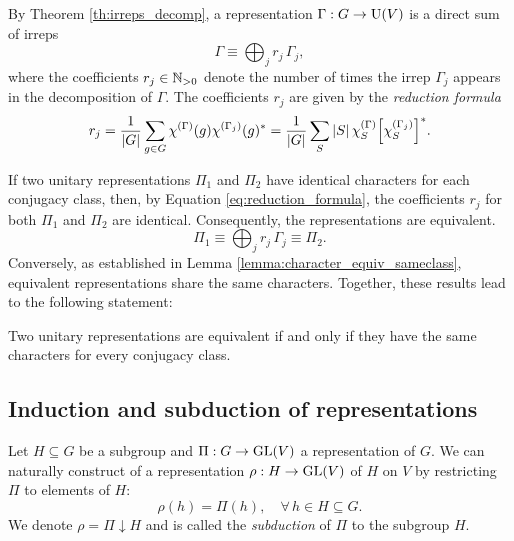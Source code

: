 \begin{theorem} \label{th:reduction_formula}
By Theorem \ref{th:irreps_decomp}, a representation $\Gamma: G \to {\text{U}}(V)$ is a direct sum of irreps
\begin{equation} \label{eq:Gamma_direct_sum_of_irreps}
\Gamma \equiv \bigoplus_j r_j \, \Gamma_j,
\end{equation}
where the coefficients $r_j \in {\mathbb{N}}_{>0}$ denote the number of times the irrep $\Gamma_j$ appears in the decomposition of $\Gamma$. The coefficients $r_j$ are given by the \textit{reduction formula}
\begin{equation} \label{eq:reduction_formula}
r_j =
\frac{1}{\abs{G}} \sum_{g \in G} \chi^{(\Gamma)}(g) \chi^{(\Gamma_j)}(g)^* =
\frac{1}{\abs{G}} \sum_{S} \abs{S} \, \chi^{(\Gamma)}_S \qty[\chi^{(\Gamma_j)}_S]^*.
\end{equation}
\end{theorem}

If two unitary representations \(\Pi_1\) and \(\Pi_2\) have identical characters for each conjugacy class, then, by Equation \ref{eq:reduction_formula}, the coefficients \(r_j\) for both \(\Pi_1\) and \(\Pi_2\) are identical. Consequently, the representations are equivalent.
\begin{equation} \label{eq:Phi_Psi_rj_equivalent}
\Pi_1 \equiv \bigoplus_j r_j \, \Gamma_j \equiv \Pi_2.
\end{equation}
Conversely, as established in Lemma \ref{lemma:character_equiv_sameclass}, equivalent representations share the same characters. Together, these results lead to the following statement:

\begin{corollary} \label{coro:same_characters_equiv_reps}
Two unitary representations are equivalent if and only if they have the same characters for every conjugacy class.
\end{corollary}


\subsection{Induction and subduction of representations} \label{sec:induction_subsuction}

\begin{definition} \label{def:subduction_defi}
Let $H \subseteq G$ be a subgroup and $\Pi: G \to {\text{GL}}(V)$ a representation of $G$. We can naturally construct of a representation $\rho: H \to {\text{GL}}(V)$ of $H$ on $V$ by restricting $\Pi$ to elements of $H$:
\begin{equation} \label{eq:subduction_defi}
\rho(h) = \Pi(h), \quad \forall \, h \in H \subseteq G.
\end{equation}
We denote $\rho = \Pi \downarrow H$ and is called the \textit{subduction} of $\Pi$ to the subgroup $H$.
\end{definition}


